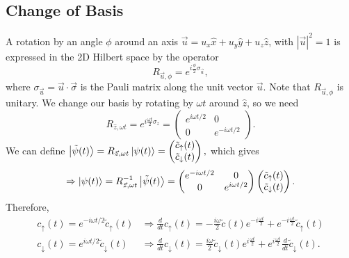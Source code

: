 \documentclass{article}
\begin{document}
\subsection{Change of Basis}
A rotation by an angle $\phi $ around an axis $\vec{u}=u_x \hat{x}+u_y \hat{y}+u_z\hat{z}$, with $\left| \vec{u} \right|^2=1$ is expressed in the 2D Hilbert space by the operator
\[
    R_{\vec{u},\phi }=e^{i \frac{\phi}{2}\sigma _{\vec{u}}},
\]
where $\sigma _{\vec{u}}=\vec{u}\cdot \vec{\sigma }$ is the Pauli matrix along the unit vector $\vec{u}$. Note that $R_{\vec{u},\phi }$ is unitary. We change our basis by rotating by $\omega t$ around $\hat{z}$, so we need
\[
    R_{\hat{z},\omega t}=e^{i \frac{\omega t}{2}\sigma _z}=\begin{pmatrix}
        e^{i\omega t/2} & 0 \\
        0 & e^{-i\omega t/2}
    \end{pmatrix}.
\]
We can define $\ket{\tilde{\psi }(t)}=R_{\vec{z},\omega t}\ket{\psi (t)}=\begin{pmatrix}
    \tilde{c}_{\uparrow}(t) \\
    \tilde{c}_{\downarrow}(t)
\end{pmatrix},$ which gives
\[
    \Rightarrow \ket{\psi (t)}=R_{\vec{z},\omega t}^{-1}\ket{\tilde{\psi }(t)}=\begin{pmatrix}
        e^{-i\omega t/2} & 0 \\
        0 & e^{i\omega t/2}
    \end{pmatrix}\begin{pmatrix}
        \tilde{c}_{\uparrow}(t) \\
        \tilde{c}_{\downarrow}(t)
    \end{pmatrix}.
\]
Therefore,
\begin{align*}
    c_{\uparrow}(t)=e^{-i\omega t/2}\tilde{c}_{\uparrow}(t) &\Rightarrow \frac{d }{d t}c_{\uparrow}(t)=-\frac{i\omega }{2}\tilde{c}(t)e^{-i \frac{\omega t}{2}}+e^{-i \frac{\omega t}{2}}\tilde{c}_{\uparrow}(t) \\
    c_{\downarrow}(t)=e^{i\omega t/2}\tilde{c}_{\downarrow}(t) &\Rightarrow \frac{d }{d t}c_{\downarrow}(t)=\frac{i\omega }{2}\tilde{c}_{\downarrow}(t)e^{i \frac{\omega t}{2}}+e^{i \frac{\omega t}{2}}\frac{d }{d t}\tilde{c}_{\downarrow}(t).
\end{align*}
\end{document}
